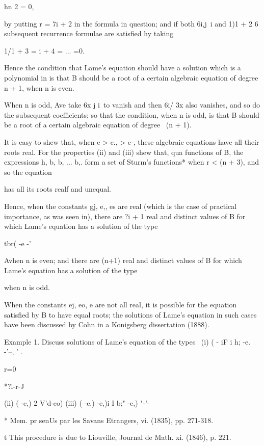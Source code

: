 {{{{hn 2 = 0,

%
%

by putting r = 7i + 2 in the formula in question; and if both 6i,j\ i
and 1)1 + 2 6 subsequent recurrence formulae are satisfied hy taking

 1/1 + 3 = i + 4 = ... =0.

Hence the condition that Lame's equation should have a solution which
is a polynomial in is that B should be a root of a certain algebraic
equation of degree n + 1, when n is even.

When n is odd, Ave take 6x j i\ to vanish and then 6i/ 3x also
vanishes, and so do the subsequent coefficients; so that the
condition, when n is odd, is that B should be a root of a certain
algebraic equation of degree \ (n + 1).

It is easy to shew that, when e > e., > e-, these algebraic equations
have all their roots real. For the properties (ii) and (iii) shew
that, qua functions of B, the expressions h, b, b, ... b,. form a
set of Sturm's functions* when r < (n + 3), and so the equation

has all its roots realf and unequal.

Hence, when the constants gj, e,, es are real (which is the case of
practical importance, as was seen in), there are ?i + 1 real
and distinct values of B for which Lame's equation has a solution of
the type

tbr( -e -'

Avhen n is even; and there are (n+1) real and distinct values of B for
which Lame's equation has a solution of the type

when n is odd.

When the constants ej, eo, e are not all real, it is possible for the
equation satisfied by B to have equal roots; the solutions of Lame's
equation in such cases have been discussed by Cohn in a Konigsberg
dissertation (1888).

Example 1. Discuss solutions of Lame's equation of the types \ (i) ( -
iF i h; -e. -'--, ' .

r=0

*?l-r-J

(ii) ( -e,) 2 V'd-eo) (iii) ( -e,) -e,)i I b;" -e,) "-'-\

* Mem. pr senUs par les Savans Etrangers, vi. (1835), pp. 271-318.

t This procedure is due to Liouville, Journal de Math. xi. (1846), p.
221.

%
%

}}}}
